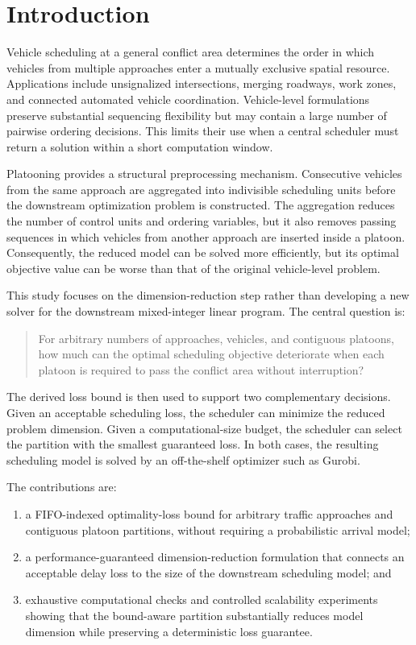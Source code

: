 \section{Introduction}
\label{sec:introduction}

Vehicle scheduling at a general conflict area determines the order in which vehicles from multiple approaches enter a mutually exclusive spatial resource. Applications include unsignalized intersections, merging roadways, work zones, and connected automated vehicle coordination. Vehicle-level formulations preserve substantial sequencing flexibility but may contain a large number of pairwise ordering decisions. This limits their use when a central scheduler must return a solution within a short computation window.

Platooning provides a structural preprocessing mechanism. Consecutive vehicles from the same approach are aggregated into indivisible scheduling units before the downstream optimization problem is constructed. The aggregation reduces the number of control units and ordering variables, but it also removes passing sequences in which vehicles from another approach are inserted inside a platoon. Consequently, the reduced model can be solved more efficiently, but its optimal objective value can be worse than that of the original vehicle-level problem.

This study focuses on the dimension-reduction step rather than developing a new solver for the downstream mixed-integer linear program. The central question is:

\begin{quote}
For arbitrary numbers of approaches, vehicles, and contiguous platoons, how much can the optimal scheduling objective deteriorate when each platoon is required to pass the conflict area without interruption?
\end{quote}

The derived loss bound is then used to support two complementary decisions. Given an acceptable scheduling loss, the scheduler can minimize the reduced problem dimension. Given a computational-size budget, the scheduler can select the partition with the smallest guaranteed loss. In both cases, the resulting scheduling model is solved by an off-the-shelf optimizer such as Gurobi.

The contributions are:
\begin{enumerate}[label=(\roman*)]
  \item a FIFO-indexed optimality-loss bound for arbitrary traffic approaches and contiguous platoon partitions, without requiring a probabilistic arrival model;
  \item a performance-guaranteed dimension-reduction formulation that connects an acceptable delay loss to the size of the downstream scheduling model; and
  \item exhaustive computational checks and controlled scalability experiments showing that the bound-aware partition substantially reduces model dimension while preserving a deterministic loss guarantee.
\end{enumerate}
